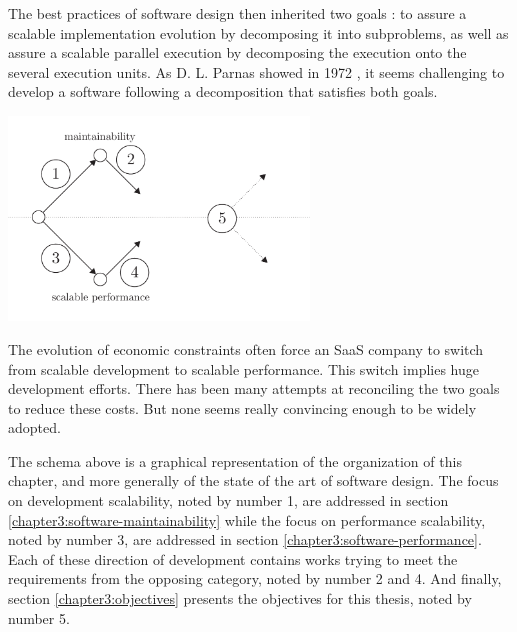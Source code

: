 The best practices of software design then inherited two goals : to assure a scalable implementation evolution by decomposing it into subproblems, as well as assure a scalable parallel execution by decomposing the execution onto the several execution units.
As D. L. Parnas showed in 1972 \cite{Parnas1972}, it seems challenging to develop a software following a decomposition that satisfies both goals.

\begin{center}
\includegraphics[width=0.6\textwidth]{../ressources/state-of-the-art.pdf}
\end{center}

The evolution of economic constraints often force an SaaS company to switch from scalable development to scalable performance.
This switch implies huge development efforts.
There has been many attempts at reconciling the two goals to reduce these costs.
But none seems really convincing enough to be widely adopted.

The schema above is a graphical representation of the organization of this chapter, and more generally of the state of the art of software design.
The focus on development scalability, noted by number 1, are addressed in section \ref{chapter3:software-maintainability} while the focus on performance scalability, noted by number 3, are addressed in section \ref{chapter3:software-performance}.
Each of these direction of development contains works trying to meet the requirements from the opposing category, noted by number 2 and 4.
And finally, section \ref{chapter3:objectives} presents the objectives for this thesis, noted by number 5.








                                    \endinput


